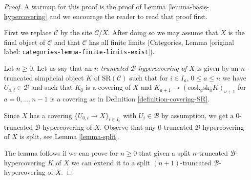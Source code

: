 \documentclass[10pt,a4paper]{article}
\theoremstyle{plain}
\theoremstyle{definition}
\theoremstyle{remark}
\numberwithin{equation}{subsection}
\begin{document}
\begin{proof}
A warmup for this proof is the proof of
Lemma \ref{lemma-basis-hypercovering} and
we encourage the reader to read that proof first.

\medskip\noindent
First we replace $\mathcal{C}$ by the site $\mathcal{C}/X$.
After doing so we may assume that $X$ is the final object
of $\mathcal{C}$ and that $\mathcal{C}$ has all finite limits
(Categories, Lemma \textnormal{[original label: \nolinkurl{categories-lemma-finite-limits-exist}]}).

\medskip\noindent
Let $n \geq 0$. Let us say that an
{\it $n$-truncated $\mathcal{B}$-hypercovering of $X$}
is given by an $n$-truncated simplicial object $K$
of $\text{SR}(\mathcal{C})$
such that for $i \in I_a$, $0 \leq a \leq n$
we have $U_{a, i} \in \mathcal{B}$ and such that
$K_0$ is a covering of $X$ and
$K_{a + 1} \to (\text{cosk}_a \text{sk}_a K)_{a + 1}$
for $a = 0, \ldots, n - 1$
is a covering as in Definition \ref{definition-covering-SR}.

\medskip\noindent
Since $X$ has a covering $\{U_{0, i} \to X\}_{i \in I_0}$
with $U_i \in \mathcal{B}$ by assumption, we get a $0$-truncated
$\mathcal{B}$-hypercovering of $X$. Observe that any $0$-truncated
$\mathcal{B}$-hypercovering of $X$ is split, see
Lemma \ref{lemma-split}.

\medskip\noindent
The lemma follows if we can prove for $n \geq 0$ that given a
split $n$-truncated $\mathcal{B}$-hypercovering $K$ of $X$
we can extend it to a
split $(n + 1)$-truncated $\mathcal{B}$-hypercovering of $X$.


\end{proof}
\end{document}
